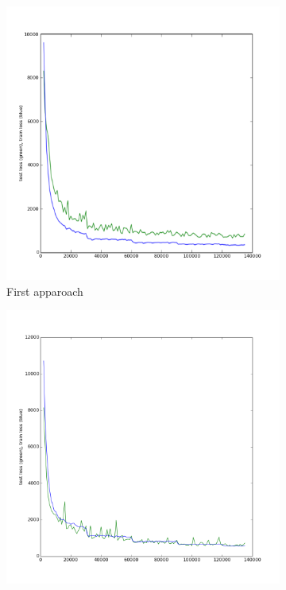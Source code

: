 \begin{figure}[ht]
\centering
\begin{subfigure}{0.33\textwidth}
\centering
\includegraphics[width=0.9\linewidth]{images/regression/test_loss_26_135000.png}
\caption{First apparoach}
\end{subfigure}%
\begin{subfigure}{0.33\textwidth}
\centering
\includegraphics[width=0.9\linewidth]{images/regression/test_loss_37_135000.png}

\end{subfigure}
\end{figure}
